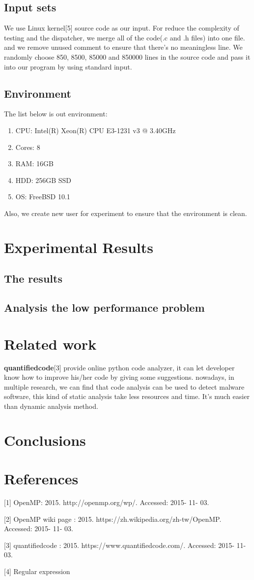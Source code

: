 \documentclass{acm_proc_article-sp}
\begin{document}
\subsection{Input sets}
	We use Linux kernel[5] source code as our input. For reduce the complexity of testing
	and the dispatcher, we merge all of the code(.c and .h files) into one file. and we remove
	unused comment to ensure that there's no meaningless line.
	We randomly choose 850, 8500, 85000 and 850000 lines in the source code and pass
	it into our program by using standard input.
\subsection{Environment}
	The list below is out environment:
	\begin{enumerate}
		\item CPU: Intel(R) Xeon(R) CPU E3-1231 v3 @ 3.40GHz
		\item Cores: 8
		\item RAM: 16GB
		\item HDD: 256GB SSD
		\item OS: FreeBSD 10.1
	\end{enumerate}
	Also, we create new user for experiment to ensure that the environment is clean.

\section{Experimental Results}
\subsection{The results}
\subsection{Analysis the low performance problem}

	
\section{Related work}

	\textbf{quantifiedcode}[3] provide online python code analyzer, it can let developer 
	know how to improve his/her code by giving some suggestions.
	nowadays, in multiple research, we can find that code analysis can be used to 
	detect malware software, this kind of static analysis take less resources and time. 
	It’s much easier than dynamic analysis method.

\section{Conclusions}


\section{References}
[1] OpenMP: 2015. http://openmp.org/wp/. Accessed: 2015- 11- 03.

[2] OpenMP wiki page : 2015. https://zh.wikipedia.org/zh-tw/OpenMP. Accessed: 2015- 11- 03.

[3] quantifiedcode : 2015. https://www.quantifiedcode.com/. Accessed: 2015- 11- 03.

[4] Regular expression
\end{document}

